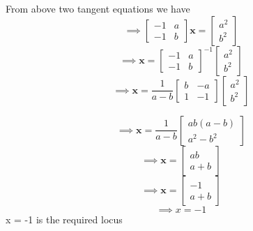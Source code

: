 \documentclass{beamer}
\begin{document}
\begin{frame}
From above two tangent equations we have
\newline
\newline
\[\implies
\begin{bmatrix}
-1 & a  \\
-1 & b
\end{bmatrix}\textbf{x}=
\begin{bmatrix}
a^{2}  \\
b^{2}
\end{bmatrix}\]
\newline
\newline
\[\implies
\textbf{x}=
\begin{bmatrix}
-1 & a  \\
-1 & b
\end{bmatrix}^{-1}
\begin{bmatrix}
a^{2}  \\
b^{2}
\end{bmatrix}\]
\newline
\newline
\[\implies
\textbf{x}=\dfrac{1}{a-b}
\begin{bmatrix}
b & -a  \\
1 & -1
\end{bmatrix}
\begin{bmatrix}
a^{2}  \\
b^{2}
\end{bmatrix}\]
\end{frame}
\begin{frame}
\[  \implies \textbf{x}=\dfrac{1}{a-b}
\begin{bmatrix}
ab(a-b)  \\
a^{2}-b^{2}
\end{bmatrix}\]
\newline\newline
\[\implies
\textbf{x}=\begin{bmatrix}
ab  \\
a+b
\end{bmatrix}\]
\newline\newline
\[\implies
\textbf{x}=\begin{bmatrix}
-1  \\
a+b
\end{bmatrix}\]
\newline
\newline
\centering
\[\implies
   x = -1\]
\newline
\newline
x = -1 is the required locus
\end{frame}
\end{document}
